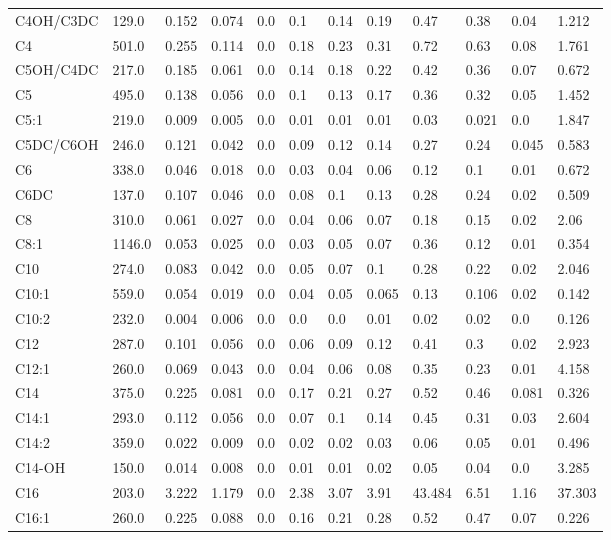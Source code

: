 \begin{tabular}{|l|l|l|l|l|l|l|l|l|l|l|l|}
C4OH/C3DC & 129.0 & 0.152 & 0.074 & 0.0 & 0.1 & 0.14 & 0.19 & 0.47 & 0.38 & 0.04 & 1.212 \\
C4 & 501.0 & 0.255 & 0.114 & 0.0 & 0.18 & 0.23 & 0.31 & 0.72 & 0.63 & 0.08 & 1.761 \\
C5OH/C4DC & 217.0 & 0.185 & 0.061 & 0.0 & 0.14 & 0.18 & 0.22 & 0.42 & 0.36 & 0.07 & 0.672 \\
C5 & 495.0 & 0.138 & 0.056 & 0.0 & 0.1 & 0.13 & 0.17 & 0.36 & 0.32 & 0.05 & 1.452 \\
C5:1 & 219.0 & 0.009 & 0.005 & 0.0 & 0.01 & 0.01 & 0.01 & 0.03 & 0.021 & 0.0 & 1.847 \\
C5DC/C6OH & 246.0 & 0.121 & 0.042 & 0.0 & 0.09 & 0.12 & 0.14 & 0.27 & 0.24 & 0.045 & 0.583 \\
C6 & 338.0 & 0.046 & 0.018 & 0.0 & 0.03 & 0.04 & 0.06 & 0.12 & 0.1 & 0.01 & 0.672 \\
C6DC & 137.0 & 0.107 & 0.046 & 0.0 & 0.08 & 0.1 & 0.13 & 0.28 & 0.24 & 0.02 & 0.509 \\
C8 & 310.0 & 0.061 & 0.027 & 0.0 & 0.04 & 0.06 & 0.07 & 0.18 & 0.15 & 0.02 & 2.06 \\
C8:1 & 1146.0 & 0.053 & 0.025 & 0.0 & 0.03 & 0.05 & 0.07 & 0.36 & 0.12 & 0.01 & 0.354 \\
C10 & 274.0 & 0.083 & 0.042 & 0.0 & 0.05 & 0.07 & 0.1 & 0.28 & 0.22 & 0.02 & 2.046 \\
C10:1 & 559.0 & 0.054 & 0.019 & 0.0 & 0.04 & 0.05 & 0.065 & 0.13 & 0.106 & 0.02 & 0.142 \\
C10:2 & 232.0 & 0.004 & 0.006 & 0.0 & 0.0 & 0.0 & 0.01 & 0.02 & 0.02 & 0.0 & 0.126 \\
C12 & 287.0 & 0.101 & 0.056 & 0.0 & 0.06 & 0.09 & 0.12 & 0.41 & 0.3 & 0.02 & 2.923 \\
C12:1 & 260.0 & 0.069 & 0.043 & 0.0 & 0.04 & 0.06 & 0.08 & 0.35 & 0.23 & 0.01 & 4.158 \\
C14 & 375.0 & 0.225 & 0.081 & 0.0 & 0.17 & 0.21 & 0.27 & 0.52 & 0.46 & 0.081 & 0.326 \\
C14:1 & 293.0 & 0.112 & 0.056 & 0.0 & 0.07 & 0.1 & 0.14 & 0.45 & 0.31 & 0.03 & 2.604 \\
C14:2 & 359.0 & 0.022 & 0.009 & 0.0 & 0.02 & 0.02 & 0.03 & 0.06 & 0.05 & 0.01 & 0.496 \\
C14-OH & 150.0 & 0.014 & 0.008 & 0.0 & 0.01 & 0.01 & 0.02 & 0.05 & 0.04 & 0.0 & 3.285 \\
C16 & 203.0 & 3.222 & 1.179 & 0.0 & 2.38 & 3.07 & 3.91 & 43.484 & 6.51 & 1.16 & 37.303 \\
C16:1 & 260.0 & 0.225 & 0.088 & 0.0 & 0.16 & 0.21 & 0.28 & 0.52 & 0.47 & 0.07 & 0.226 \\

\end{tabular}
